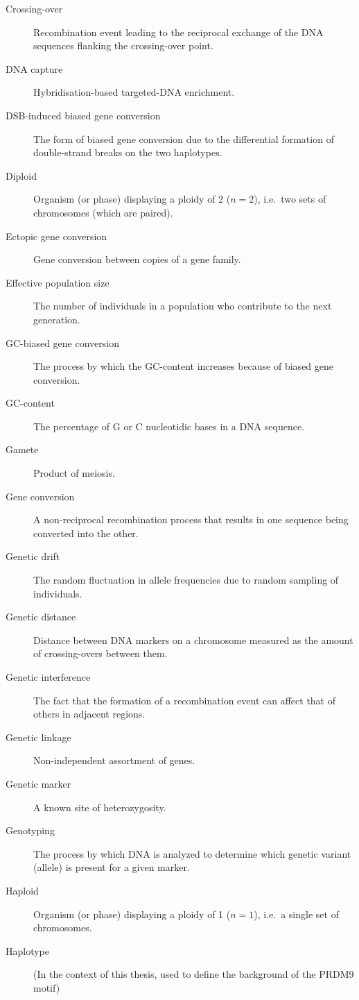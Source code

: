 \begin{alwayssingle}
\begin{description}
		\item[Crossing-over] Recombination event leading to the reciprocal exchange of the DNA sequences flanking the crossing-over point.
		\item[DNA capture] Hybridisation-based targeted-DNA enrichment.
		\item[DSB-induced biased gene conversion] The form of biased gene conversion due to the differential formation of double-strand breaks on the two haplotypes.
		\item[Diploid] Organism (or phase) displaying a ploidy of 2 ($n=2$), i.e.\ two sets of chromosomes (which are paired).
		\item[Ectopic gene conversion] Gene conversion between copies of a gene family.
		\item[Effective population size] The number of individuals in a population who contribute to the next generation.
		\item[GC-biased gene conversion] The process by which the GC-content increases because of biased gene conversion.
		\item[GC-content] The percentage of G or C nucleotidic bases in a DNA sequence.
		\item[Gamete] Product of meiosis.
		\item[Gene conversion] A non-reciprocal recombination process that results in one sequence being converted into the other.
		\item[Genetic drift] The random fluctuation in allele frequencies due to random sampling of individuals.
		\item[Genetic distance] Distance between DNA markers on a chromosome measured as the amount of crossing-overs between them.
		\item[Genetic interference] The fact that the formation of a recombination event can affect that of others in adjacent regions.
		\item[Genetic linkage] Non-independent assortment of genes.
		\item[Genetic marker] A known site of heterozygosity.
		\item[Genotyping] The process by which DNA is analyzed to determine which genetic variant (allele) is present for a given marker.
		\item[Haploid] Organism (or phase) displaying a ploidy of 1 ($n=1$), i.e.\ a single set of chromosomes.
		\item[Haplotype] (In the context of this thesis, used to define the background of the PRDM9 motif)

\end{description}
\end{alwayssingle}
